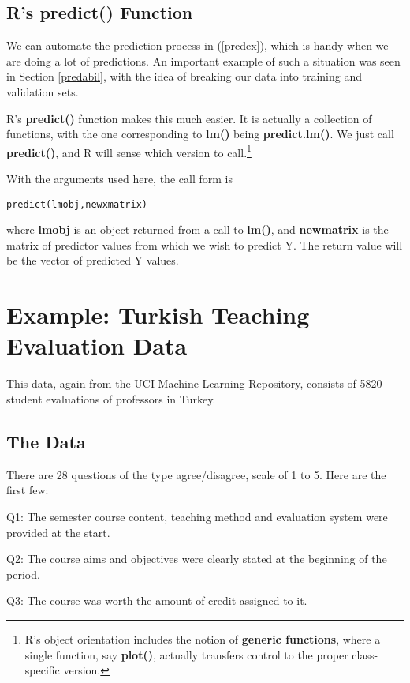 \subsection{R's predict() Function}

We can automate the prediction process in (\ref{predex}), which is handy
when we are doing a lot of predictions.  An important example of such a
situation was seen in Section \ref{predabil}, with the idea of breaking
our data into training and validation sets.

R's {\bf predict()} function makes this much easier.  It is actually a
collection of functions, with the one corresponding to {\bf lm()} being
{\bf predict.lm()}.  We just call {\bf predict()}, and R will sense
which version to call.\footnote{R's object orientation includes the
notion of {\bf generic functions}, where a single function, say {\bf
plot()}, actually transfers control to the proper class-specific
version.}

With the arguments used here, the call form is 

\begin{lstlisting}
predict(lmobj,newxmatrix)
\end{lstlisting}

where {\bf lmobj} is an object returned from a call to {\bf lm()}, and
{\bf newmatrix} is the matrix of predictor values from which we wish to
predict Y.  The return value will be the vector of predicted Y values.

\section{Example:  Turkish Teaching Evaluation Data}
\label{turk0}

This data, again from the UCI Machine Learning Repository, consists
of 5820 student evaluations of professors in Turkey.  

\subsection{The Data}

There are 28 questions of the type agree/disagree, scale of 1 to 5.
Here are the first few:

Q1: The semester course content, teaching method and evaluation system
were provided at the start.

Q2: The course aims and objectives were clearly stated at the beginning
of the period.

Q3: The course was worth the amount of credit assigned to it.

